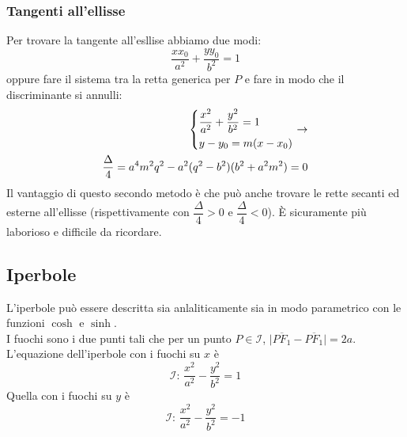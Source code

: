 \subsubsection{Tangenti all'ellisse}
Per trovare la tangente all'esllise abbiamo due modi:
\begin{equation*}
\frac{xx_0}{a^2}+\frac{yy_0}{b^2}=1
\end{equation*}
oppure fare il sistema tra la retta generica per $P$ e fare in modo che il discriminante si annulli:
\begin{align*}
\begin{dcases}
\frac{x^2}{a^2}+\frac{y^2}{b^2}=1\\
y-y_0=m(x-x_0)
\end{dcases}\rightarrow\\ \frac{\Delta}{4}=a^4m^2q^2-a^2(q^2-b^2)(b^2+a^2m^2) = 0
\end{align*}
Il vantaggio di questo secondo metodo è che può anche trovare le rette secanti ed esterne all'ellisse
(rispettivamente con $\dfrac{\Delta}{4}>0$ e $\dfrac{\Delta}{4}<0$). È sicuramente più laborioso e
difficile da ricordare.

\subsection{Iperbole}
\begin{center}
\end{center}

L'iperbole può essere descritta sia anlaliticamente sia in modo parametrico con le funzioni $\cosh$ e
$\sinh$.\\
I fuochi sono i due punti tali che per un punto $P\in\mathscr{I}$, 
$\lvert \overline{PF_1}-\overline{PF_1}\rvert=2a$.\\
L'equazione dell'iperbole con i fuochi su $x$ è
\begin{equation*}
\mathscr{I}:\,\frac{x^2}{a^2}-\frac{y^2}{b^2}=1
\end{equation*}
Quella con i fuochi su $y$ è
\begin{equation*}
\mathscr{I}:\,\frac{x^2}{a^2}-\frac{y^2}{b^2}=-1
\end{equation*}

